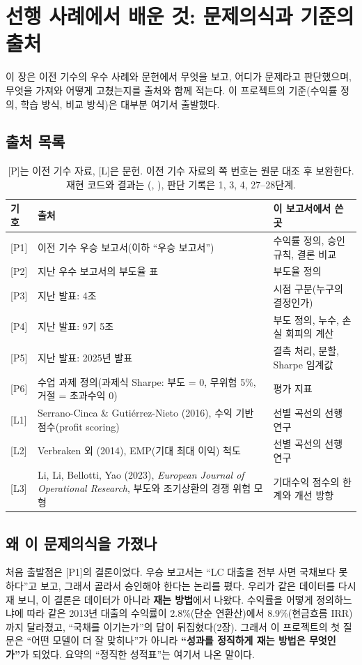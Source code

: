 \chapter*{선행 사례에서 배운 것: 문제의식과 기준의 출처}

이 장은 이전 기수의 우수 사례와 문헌에서 무엇을 보고, 어디가 문제라고 판단했으며, 무엇을 가져와 어떻게 고쳤는지를 출처와 함께 적는다. 이 프로젝트의 기준(수익률 정의, 학습 방식, 비교 방식)은 대부분 여기서 출발했다.

\section*{출처 목록}
\begin{table}[H]\centering\small
\begin{tabularx}{\linewidth}{@{}p{12mm}p{48mm}L@{}}\toprule
기호 & 출처 & 이 보고서에서 쓴 곳\\\midrule
{}[P1] & 이전 기수 우승 보고서(이하 ``우승 보고서'') & 수익률 정의, 승인 규칙, 결론 비교\\
{}[P2] & 지난 우수 보고서의 부도율 표 & 부도율 정의\\
{}[P3] & 지난 발표: 4조 & 시점 구분(누구의 결정인가)\\
{}[P4] & 지난 발표: 9기 5조 & 부도 정의, 누수, 손실 회피의 계산\\
{}[P5] & 지난 발표: 2025년 발표 & 결측 처리, 분할, Sharpe 임계값\\
{}[P6] & 수업 과제 정의(과제식 Sharpe: 부도 = 0, 무위험 5\%, 거절 = 초과수익 0) & 평가 지표\\
{}[L1] & Serrano-Cinca \& Guti\'errez-Nieto (2016), 수익 기반 점수(profit scoring) & 선별 곡선의 선행 연구\\
{}[L2] & Verbraken 외 (2014), EMP(기대 최대 이익) 척도 & 선별 곡선의 선행 연구\\
{}[L3] & Li, Li, Bellotti, Yao (2023), \emph{European Journal of Operational Research}, 부도와 조기상환의 경쟁 위험 모형 & 기대수익 점수의 한계와 개선 방향\\\bottomrule
\end{tabularx}
\caption{[P]는 이전 기수 자료, [L]은 문헌. 이전 기수 자료의 쪽 번호는 원문 대조 후 보완한다. 재현 코드와 결과는 (, ), 판단 기록은  1, 3, 4, 27--28단계.}
\end{table}

\section*{왜 이 문제의식을 가졌나}
처음 출발점은 [P1]의 결론이었다. 우승 보고서는 ``LC 대출을 전부 사면 국채보다 못하다''고 보고, 그래서 골라서 승인해야 한다는 논리를 폈다. 우리가 같은 데이터를 다시 재 보니, 이 결론은 데이터가 아니라 \textbf{재는 방법}에서 나왔다. 수익률을 어떻게 정의하느냐에 따라 같은 2013년 대출의 수익률이 2.8\%(단순 연환산)에서 8.9\%(현금흐름 IRR)까지 달라졌고, ``국채를 이기는가''의 답이 뒤집혔다(2장). 그래서 이 프로젝트의 첫 질문은 ``어떤 모델이 더 잘 맞히나''가 아니라 \textbf{``성과를 정직하게 재는 방법은 무엇인가''}가 되었다. 요약의 ``정직한 성적표''는 여기서 나온 말이다.

